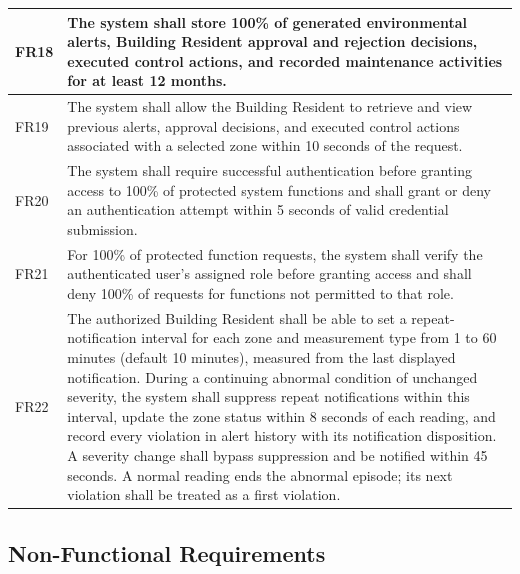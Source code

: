 \documentclass[11pt,a4paper]{article}
\begin{document}
{\begin{xltabular}{\linewidth}{|B{1.3cm}|Y|}
FR18 & The system shall store 100\% of generated environmental alerts, Building Resident approval and rejection decisions, executed control actions, and recorded maintenance activities for at least 12 months.\\\hline
FR19 & The system shall allow the Building Resident to retrieve and view previous alerts, approval decisions, and executed control actions associated with a selected zone within 10 seconds of the request.\\\hline
FR20 & The system shall require successful authentication before granting access to 100\% of protected system functions and shall grant or deny an authentication attempt within 5 seconds of valid credential submission.\\\hline
FR21 & For 100\% of protected function requests, the system shall verify the authenticated user's assigned role before granting access and shall deny 100\% of requests for functions not permitted to that role.\\\hline
FR22 & The authorized Building Resident shall be able to set a repeat-notification interval for each zone and measurement type from 1 to 60 minutes (default 10 minutes), measured from the last displayed notification. During a continuing abnormal condition of unchanged severity, the system shall suppress repeat notifications within this interval, update the zone status within 8 seconds of each reading, and record every violation in alert history with its notification disposition. A severity change shall bypass suppression and be notified within 45 seconds. A normal reading ends the abnormal episode; its next violation shall be treated as a first violation.\\\hline
\end{xltabular}}

\subsection{Non-Functional Requirements}
\end{document}
